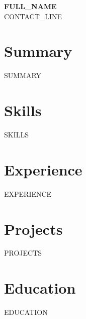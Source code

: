 \documentclass[letterpaper,10.5pt]{article}
\begin{document}
\begin{center}
  {\LARGE\bfseries {{FULL_NAME}}}\\[0.35em]
  {{CONTACT_LINE}}
\end{center}

\vspace{0.4em}

\section{Summary}
{{SUMMARY}}

\section{Skills}
{{SKILLS}}

\section{Experience}
{{EXPERIENCE}}

\section{Projects}
{{PROJECTS}}

\section{Education}
{{EDUCATION}}
\end{document}
